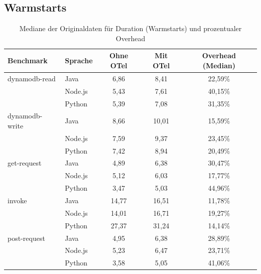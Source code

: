 \subsection{Warmstarts}
\label{app:raw:hot}
\begin{table}[H]
\centering
\footnotesize
\caption{Mediane der Originaldaten für Duration (Warmstarts) und prozentualer Overhead}
\label{app:raw-duration-hot}
\begin{tabular}{|l|l|c|c|c|}
\hline
\textbf{Benchmark} & \textbf{Sprache} & \textbf{Ohne OTel} & \textbf{Mit OTel} & \textbf{Overhead (Median)} \\
\hline
dynamodb-read   & Java    &   6,86 &   8,41 & 22,59\% \\
                & Node.js &   5,43 &   7,61 & 40,15\% \\
                & Python  &   5,39 &   7,08 & 31,35\% \\
\hline
dynamodb-write  & Java    &   8,66 &  10,01 & 15,59\% \\
                & Node.js &   7,59 &   9,37 & 23,45\% \\
                & Python  &   7,42 &   8,94 & 20,49\% \\
\hline
get-request     & Java    &   4,89 &   6,38 & 30,47\% \\
                & Node.js &   5,12 &   6,03 & 17,77\% \\
                & Python  &   3,47 &   5,03 & 44,96\% \\
\hline
invoke          & Java    &  14,77 &  16,51 & 11,78\% \\
                & Node.js &  14,01 &  16,71 & 19,27\% \\
                & Python  &  27,37 &  31,24 & 14,14\% \\
\hline
post-request    & Java    &   4,95 &   6,38 & 28,89\% \\
                & Node.js &   5,23 &   6,47 & 23,71\% \\
                & Python  &   3,58 &   5,05 & 41,06\% \\
\hline
\end{tabular}
\end{table}

